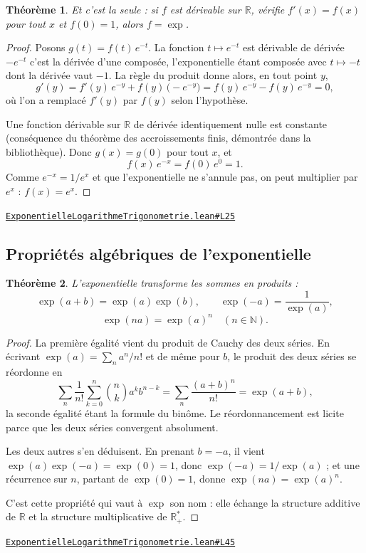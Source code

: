 \documentclass[11pt,a4paper]{article}
\theoremstyle{definition}
\theoremstyle{plain}
\newtheorem{theoreme}{Théorème}
\newcommand{\source}[2]{\par\smallskip\noindent\hfill{\footnotesize\href{#1}{\texttt{#2}}}\par\smallskip}
\begin{document}
\begin{theoreme}
Et c'est la seule : si $f$ est dérivable sur $\mathbb{R}$, vérifie $f'(x) = f(x)$ pour tout
$x$ et $f(0) = 1$, alors $f = \exp$.
\end{theoreme}

\begin{proof}
Posons $g(t) = f(t)\,e^{-t}$. La fonction $t \mapsto e^{-t}$ est dérivable de dérivée
$-e^{-t}$ \textemdash{} c'est la dérivée d'une composée, l'exponentielle étant composée avec
$t \mapsto -t$ dont la dérivée vaut $-1$. La règle du produit donne alors, en tout point
$y$,
\[ g'(y) = f'(y)\,e^{-y} + f(y)\,\bigl(-e^{-y}\bigr)
        = f(y)\,e^{-y} - f(y)\,e^{-y} = 0 , \]
où l'on a remplacé $f'(y)$ par $f(y)$ selon l'hypothèse.

Une fonction dérivable sur $\mathbb{R}$ de dérivée identiquement nulle est constante
(conséquence du théorème des accroissements finis, démontrée dans la bibliothèque). Donc
$g(x) = g(0)$ pour tout $x$, et
\[ f(x)\,e^{-x} = f(0)\,e^{0} = 1 . \]
Comme $e^{-x} = 1/e^{x}$ et que l'exponentielle ne s'annule pas, on peut multiplier par
$e^{x}$ : $f(x) = e^{x}$.
\end{proof}
\source{https://github.com/Commutator-IO/learn-lean/blob/main/courses/02-lycee/05-exponentielle-logarithme-trigonometrie/ExponentielleLogarithmeTrigonometrie.lean\#L25}{ExponentielleLogarithmeTrigonometrie.lean\#L25}

\subsection{Propriétés algébriques de l'exponentielle}

\begin{theoreme}
L'exponentielle transforme les sommes en produits :
\[ \exp(a + b) = \exp(a)\exp(b), \qquad \exp(-a) = \frac{1}{\exp(a)}, \]
\[ \exp(na) = \exp(a)^{n} \quad (n \in \mathbb{N}) . \]
\end{theoreme}

\begin{proof}
La première égalité vient du produit de Cauchy des deux séries. En écrivant $\exp(a) = \sum_n a^n/n!$ et de même pour $b$, le produit des deux séries se
réordonne en
\[ \sum_{n} \frac{1}{n!} \sum_{k=0}^{n} \binom{n}{k} a^{k} b^{n-k}
   = \sum_{n} \frac{(a+b)^n}{n!} = \exp(a + b) , \]
la seconde égalité étant la formule du binôme. Le réordonnancement est licite parce que les
deux séries convergent absolument.

Les deux autres s'en déduisent. En prenant $b = -a$, il vient $\exp(a)\exp(-a) = \exp(0) = 1$,
donc $\exp(-a) = 1/\exp(a)$ ; et une récurrence sur $n$, partant de $\exp(0) = 1$, donne
$\exp(na) = \exp(a)^{n}$.

\medskip\noindent
C'est cette propriété qui vaut à $\exp$ son nom : elle échange la structure additive de
$\mathbb{R}$ et la structure multiplicative de $\mathbb{R}_{+}^{*}$.
\end{proof}
\source{https://github.com/Commutator-IO/learn-lean/blob/main/courses/02-lycee/05-exponentielle-logarithme-trigonometrie/ExponentielleLogarithmeTrigonometrie.lean\#L45}{ExponentielleLogarithmeTrigonometrie.lean\#L45}
\end{document}
